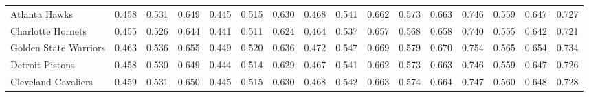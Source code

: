 \documentclass[11pt,a4paper]{article}
\begin{document}
\begin{table}[H]
\begin{tabular}{l ccc ccc ccc ccc ccc}
Atlanta Hawks & 0.458 & 0.531 & 0.649 & 0.445 & 0.515 & 0.630 & 0.468 & 0.541 & 0.662 & 0.573 & 0.663 & 0.746 & 0.559 & 0.647 & 0.727 \\
Charlotte Hornets & 0.455 & 0.526 & 0.644 & 0.441 & 0.511 & 0.624 & 0.464 & 0.537 & 0.657 & 0.568 & 0.658 & 0.740 & 0.555 & 0.642 & 0.721 \\
Golden State Warriors & 0.463 & 0.536 & 0.655 & 0.449 & 0.520 & 0.636 & 0.472 & 0.547 & 0.669 & 0.579 & 0.670 & 0.754 & 0.565 & 0.654 & 0.734 \\
Detroit Pistons & 0.458 & 0.530 & 0.649 & 0.444 & 0.514 & 0.629 & 0.467 & 0.541 & 0.662 & 0.573 & 0.663 & 0.746 & 0.559 & 0.647 & 0.726 \\
Cleveland Cavaliers & 0.459 & 0.531 & 0.650 & 0.445 & 0.515 & 0.630 & 0.468 & 0.542 & 0.663 & 0.574 & 0.664 & 0.747 & 0.560 & 0.648 & 0.728 \\
\bottomrule
\end{tabular}
\end{table}
\end{document}
